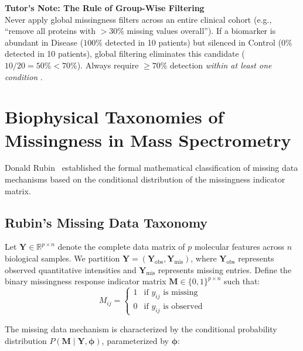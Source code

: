 \documentclass[11pt,oneside]{book}
\begin{document}
\begin{notebox}
\textbf{Tutor's Note: The Rule of Group-Wise Filtering}\\
Never apply global missingness filters across an entire clinical cohort (e.g., ``remove all proteins with $>30\%$ missing values overall''). If a biomarker is abundant in Disease ($100\%$ detected in 10 patients) but silenced in Control ($0\%$ detected in 10 patients), global filtering eliminates this candidate ($10/20 = 50\% < 70\%$). Always require $\ge 70\%$ detection \textit{within at least one condition} \cite{zhang2018dep, webb2020review}.
\end{notebox}

\section{Biophysical Taxonomies of Missingness in Mass Spectrometry}

Donald Rubin~\cite{rubin1976inference} established the formal mathematical classification of missing data mechanisms based on the conditional distribution of the missingness indicator matrix.

\subsection{Rubin's Missing Data Taxonomy}

Let $\mathbf{Y} \in \mathbb{R}^{p \times n}$ denote the complete data matrix of $p$ molecular features across $n$ biological samples. We partition $\mathbf{Y} = (\mathbf{Y}_{\text{obs}}, \mathbf{Y}_{\text{mis}})$, where $\mathbf{Y}_{\text{obs}}$ represents observed quantitative intensities and $\mathbf{Y}_{\text{mis}}$ represents missing entries. Define the binary missingness response indicator matrix $\mathbf{M} \in \{0, 1\}^{p \times n}$ such that:
\begin{equation}
M_{ij} = \begin{cases} 1 & \text{if } y_{ij} \text{ is missing} \\ 0 & \text{if } y_{ij} \text{ is observed} \end{cases}
\end{equation}

The missing data mechanism is characterized by the conditional probability distribution $P(\mathbf{M} \mid \mathbf{Y}, \boldsymbol{\phi})$, parameterized by $\boldsymbol{\phi}$:
\end{document}
